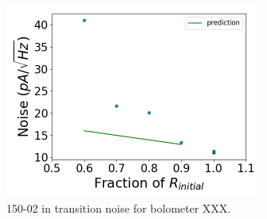 \begin{figure}[ht!]
\begin{center}
\includegraphics[height=2.5in]{figures/150-02_b53w0c0_it_noise.png}
\caption{150-02 in transition noise for bolometer XXX. 
\label{fig:150-02_it_noise} }
\end{center}
\end{figure}





